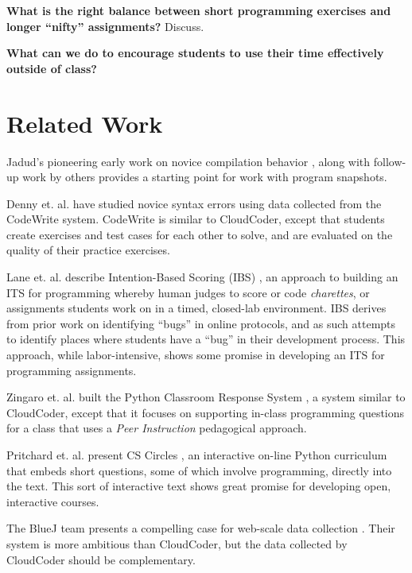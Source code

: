 \documentclass{sig-alternate}
\begin{document}
{\bf What is the right balance between short programming exercises and
  longer ``nifty'' assignments?}
Discuss.

{\bf What can we do to encourage students to use their time effectively outside of class?}

\section{Related Work}

Jadud's pioneering early work on novice compilation behavior
\cite{Jadud:2006:MTE:1151588.1151600}, along with follow-up work by
others \cite{Norris:2008:CCQ:1384271.1384284} provides a starting point for
work with program snapshots.

Denny et. al. have studied novice syntax errors
\cite{Denny:2012:SEE:2325296.2325318} using data collected from the CodeWrite system.
CodeWrite is similar to CloudCoder, except that students create
exercises and test cases for each other to solve, and are evaluated on
the quality of their practice exercises.

Lane et. al. describe Intention-Based Scoring (IBS) \cite{Lane:2005:ISA:1047344.1047471},
an approach to building an ITS for programming whereby human
judges to score or code {\em charettes}, or assignments students work on in a
timed, closed-lab environment.  IBS derives from prior work on
identifying ``bugs'' in online protocols, and as such attempts to
identify places where students have a ``bug'' in their development
process.  This approach, while labor-intensive, shows some promise in
developing an ITS for programming assignments.

Zingaro et. al. built the Python Classroom Response System
\cite{Zingaro:2013:FCP:2445196.2445369}, a system similar to
CloudCoder, except that it focuses on supporting in-class programming
questions for a class that uses a {\em Peer Instruction} pedagogical approach.

Pritchard et. al. present CS Circles
\cite{Pritchard:2013:CCI:2445196.2445370}, an interactive on-line
Python curriculum that embeds short questions, some of which involve
programming, directly into the text.  This sort of interactive text
shows great promise for developing open, interactive courses.

The BlueJ team presents a compelling case for web-scale data
collection \cite{Utting:2012:WDG:2361276.2361278}.  Their system is
more ambitious than CloudCoder, but the data collected by CloudCoder
should be complementary.
\end{document}
